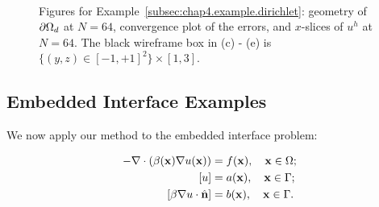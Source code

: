 \setlength{\figureheighti}{0.43\textwidth}
\setlength{\figurewidthii}{0.33\textwidth}
\begin{figure}[htbp]
\centering
{}
 \\
\caption{Figures for Example~\ref{subsec:chap4.example.dirichlet}: geometry of $\partial\Omega_d$ at $N = 64$, convergence plot of the errors, and $x$-slices of $u^h$ at $N = 64$. The black wireframe box in (c) - (e) is $\{(y,z) \in [-1,+1]^2\} \times [1,3]$.}
\label{fig:chap4.examples.dirichlet}
\end{figure}

\subsection{Embedded Interface Examples} \label{subsec:chap4.examples.interface}

We now apply our method to the embedded interface problem:

\begin{align*}
-\nabla \cdot \left( \beta(\mathbf{x}) \nabla u(\mathbf{x}) \right) & = f(\mathbf{x}), \quad \mathbf{x} \in \Omega; \\
\left[ u \right] & = a(\mathbf{x}), \quad \mathbf{x} \in \Gamma; \\
\left[ \beta \nabla u \cdot \hat{\mathbf{n}} \right] & = b(\mathbf{x}), \quad \mathbf{x} \in \Gamma.
\end{align*}


